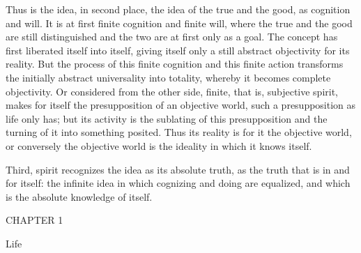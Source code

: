 Thus is the idea, in second place,
the idea of the true and the good,
as cognition and will.
It is at first finite cognition and finite will,
where the true and the good are still distinguished
and the two are at first only as a goal.
The concept has first liberated itself into itself,
giving itself only a still abstract objectivity for its reality.
But the process of this finite cognition and this finite action
transforms the initially abstract universality into totality,
whereby it becomes complete objectivity.
Or considered from the other side,
finite, that is, subjective spirit,
makes for itself the
presupposition of an objective world,
such a presupposition as life only has;
but its activity is the sublating of this presupposition
and the turning of it into something posited.
Thus its reality is for it the objective world,
or conversely the objective world is
the ideality in which it knows itself.

Third, spirit recognizes the idea
as its absolute truth,
as the truth that is in and for itself:
the infinite idea in which
cognizing and doing are equalized,
and which is the absolute knowledge of itself.

CHAPTER 1

Life

